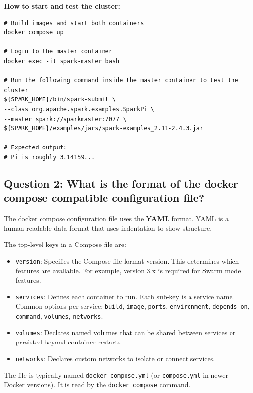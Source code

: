 \documentclass[11pt,a4paper]{article}
\begin{document}
\textbf{How to start and test the cluster:}
\begin{lstlisting}[style=shell]
# Build images and start both containers
docker compose up

# Login to the master container
docker exec -it spark-master bash

# Run the following command inside the master container to test the cluster
${SPARK_HOME}/bin/spark-submit \
--class org.apache.spark.examples.SparkPi \
--master spark://sparkmaster:7077 \
${SPARK_HOME}/examples/jars/spark-examples_2.11-2.4.3.jar

# Expected output:
# Pi is roughly 3.14159...
\end{lstlisting}

\subsection{Question 2: What is the format of the docker compose compatible configuration file?}

The docker compose configuration file uses the \textbf{YAML} format. YAML is a human-readable data format that uses
indentation to show structure.

The top-level keys in a Compose file are:

\begin{itemize}[leftmargin=1.5cm]
  \item \texttt{version}: Specifies the Compose file format version. This
        determines which features are available. For example, version 3.x
        is required for Swarm mode features.
  \item \texttt{services}: Defines each container to run. Each sub-key is
        a service name. Common options per service: \texttt{build},
        \texttt{image}, \texttt{ports}, \texttt{environment},
        \texttt{depends\_on}, \texttt{command}, \texttt{volumes},
        \texttt{networks}.
  \item \texttt{volumes}: Declares named volumes that can be shared
        between services or persisted beyond container restarts.
  \item \texttt{networks}: Declares custom networks to isolate or connect
        services.
\end{itemize}

The file is typically named \texttt{docker-compose.yml} (or
\texttt{compose.yml} in newer Docker versions). It is read by the
\texttt{docker compose} command.
\end{document}
